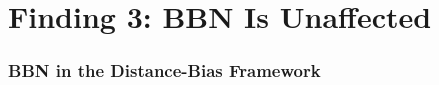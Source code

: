 \documentclass[11pt,a4paper]{article}
\begin{document}
\part{Finding 3: BBN Is Unaffected}
\label{sec:bbn}


\section{BBN in the Distance-Bias Framework}
\end{document}
